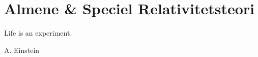 \chapter{Almene \& Speciel Relativitetsteori}
\label{AlmSpecielRelativitetsteori}
\epigraph{Life is an experiment.}{A. Einstein}
\minitoc
\clearpage

\lipsum